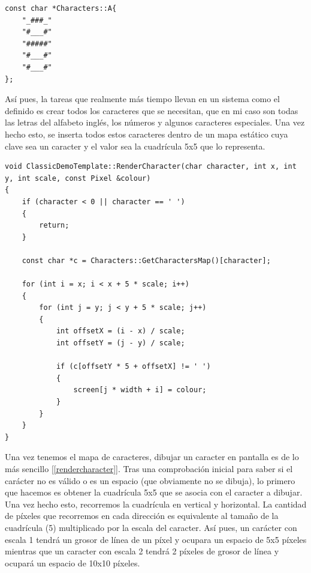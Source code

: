 \begin{lstlisting}[style=C-color, caption={Método que renderiza un sólo caracter},label=fontA]
const char *Characters::A{
    "_###_"
    "#___#"
    "#####"
    "#___#"
    "#___#"
};
\end{lstlisting}

Así pues, la tareas que realmente más tiempo llevan en un sistema como el definido es crear todos los caracteres que se necesitan, que en mi caso son todas las letras del alfabeto inglés, los números y algunos caracteres especiales. Una vez hecho esto, se inserta todos estos caracteres dentro de un mapa estático cuya clave sea un caracter y el valor sea la cuadrícula 5x5 que lo representa.\\

\begin{lstlisting}[style=C-color, caption={Método que renderiza un sólo caracter},label=rendercharacter]
void ClassicDemoTemplate::RenderCharacter(char character, int x, int y, int scale, const Pixel &colour)
{
    if (character < 0 || character == ' ')
    {
        return;
    }

    const char *c = Characters::GetCharactersMap()[character];

    for (int i = x; i < x + 5 * scale; i++)
    {
        for (int j = y; j < y + 5 * scale; j++)
        {
            int offsetX = (i - x) / scale;
            int offsetY = (j - y) / scale;

            if (c[offsetY * 5 + offsetX] != ' ')
            {
                screen[j * width + i] = colour;
            }
        }
    }
}
\end{lstlisting}

Una vez tenemos el mapa de caracteres, dibujar un caracter en pantalla es de lo más sencillo [\ref{rendercharacter}]. Tras una comprobación inicial para saber si el carácter no es válido o es un espacio (que obviamente no se dibuja), lo primero que hacemos es obtener la cuadrícula 5x5 que se asocia con el caracter a dibujar.\\

Una vez hecho esto, recorremos la cuadrícula en vertical y horizontal. La cantidad de píxeles que recorremos en cada dirección es equivalente al tamaño de la cuadrícula (5) multiplicado por la escala del caracter. Así pues, un carácter con escala 1 tendrá un grosor de línea de un píxel y ocupara un espacio de 5x5 píxeles mientras que un caracter con escala 2 tendrá 2 píxeles de grosor de línea y ocupará un espacio de 10x10 píxeles.\\

